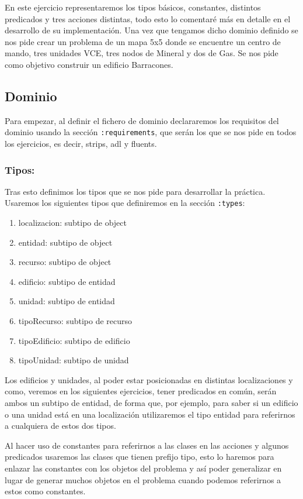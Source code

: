 \documentclass[10pt, spanish]{article}
\begin{document}
En este ejercicio representaremos los tipos básicos, constantes, distintos predicados y tres acciones distintas, todo esto lo comentaré más en detalle en el desarrollo de su implementación. Una vez que tengamos dicho dominio definido se nos pide crear un problema de un mapa 5x5 donde se encuentre un centro de mando, tres unidades VCE, tres nodos de Mineral y dos de Gas. Se nos pide como objetivo construir un edificio Barracones.


\subsection{Dominio}

Para empezar, al definir el fichero de dominio declararemos los requisitos del dominio usando la sección \texttt{:requirements}, que serán los que se nos pide en todos los ejercicios, es decir, strips, adl y fluents.

\subsubsection{Tipos:}

Tras esto definimos los tipos que se nos pide para desarrollar la práctica. Usaremos los siguientes tipos que definiremos en la sección \texttt{:types}:

\begin{enumerate}
	\item localizacion: subtipo de object
	\item entidad: subtipo de object
	\item recurso: subtipo de object
	\item edificio: subtipo de entidad
	\item unidad: subtipo de entidad
	\item tipoRecurso: subtipo de recurso
	\item tipoEdificio: subtipo de edificio
	\item tipoUnidad: subtipo de unidad
\end{enumerate}

Los edificios y unidades, al poder estar posicionadas en distintas localizaciones y como, veremos en los siguientes ejercicios, tener predicados en común, serán ambos un subtipo de entidad, de forma que, por ejemplo, para saber si un edificio o una unidad está en una localización utilizaremos el tipo entidad para referirnos a cualquiera de estos dos tipos.

Al hacer uso de constantes para referirnos a las clases en las acciones y algunos predicados usaremos las clases que tienen prefijo tipo, esto lo haremos para enlazar las constantes con los objetos del problema y así poder generalizar en lugar de generar muchos objetos en el problema cuando podemos referirnos a estos como constantes.
\end{document}
